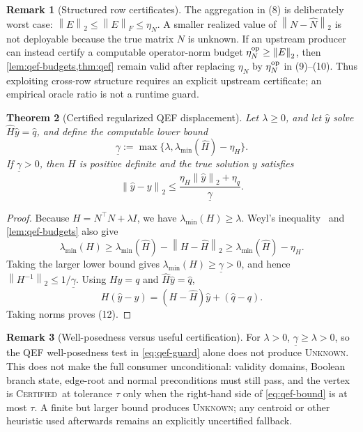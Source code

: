 \documentclass[11pt]{article}
\newtheorem{theorem}{Theorem}
\theoremstyle{definition}
\newtheorem{remark}[theorem]{Remark}
\newcommand{\norm}[1]{\left\lVert#1\right\rVert}
\newcommand{\Certified}{\textsc{Certified}}
\newcommand{\Unknown}{\textsc{Unknown}}
\begin{document}
\begin{remark}[Structured row certificates]
\label{rem:row-structure}
The aggregation in (8) is deliberately worst case:
\(\norm E_2\le\norm E_F\le\eta_N\).  A smaller realized value of
\(\norm{N-\widehat N}_2\) is not deployable because the true matrix \(N\) is
unknown.  If an upstream producer can instead certify a computable
operator-norm budget \(\eta_N^{\rm op}\ge\norm E_2\), then
\cref{lem:qef-budgets,thm:qef} remain valid after replacing \(\eta_N\) by
\(\eta_N^{\rm op}\) in (9)--(10).  Thus exploiting cross-row structure requires
an explicit upstream certificate; an empirical oracle ratio is not a runtime
guard.
\end{remark}

\begin{theorem}[Certified regularized QEF displacement]
\label{thm:qef}
Let \(\lambda\ge0\), and let \(\widehat y\) solve
\(
\widehat H\widehat y=\widehat q
\), and define the computable lower bound
\[
\underline\gamma
:=\max\{\lambda,\lambda_{\min}(\widehat H)-\eta_H\}.
\tag{11}\label{eq:qef-guard}
\]
If \(\underline\gamma>0\), then \(H\) is positive definite and the true
solution \(y\) satisfies
\[
\boxed{
\norm{\widehat y-y}_2
\le
\frac{\eta_H\norm{\widehat y}_2+\eta_q}{\underline\gamma}.}
\tag{12}\label{eq:qef-bound}
\]
\end{theorem}

\begin{proof}
Because \(H=N^\top N+\lambda I\), we have
\(\lambda_{\min}(H)\ge\lambda\).  Weyl's inequality~\cite{bhatia1997matrix}
and
\cref{lem:qef-budgets} also give
\[
\lambda_{\min}(H)
\ge\lambda_{\min}(\widehat H)-\norm{H-\widehat H}_2
\ge\lambda_{\min}(\widehat H)-\eta_H.
\]
Taking the larger lower bound gives
\(\lambda_{\min}(H)\ge\underline\gamma>0\), and hence
\(\norm{H^{-1}}_2\le1/\underline\gamma\).  Using
\(Hy=q\) and \(\widehat H\widehat y=\widehat q\),
\[
H(\widehat y-y)
=(H-\widehat H)\widehat y+(\widehat q-q).
\]
Taking norms proves (12).
\end{proof}

\begin{remark}[Well-posedness versus useful certification]
\label{rem:fail-closed}
For \(\lambda>0\), \(\underline\gamma\ge\lambda>0\), so the QEF
well-posedness test in \eqref{eq:qef-guard} alone does not produce
\Unknown.  This does not make the full consumer unconditional: validity
domains, Boolean branch state, edge-root and normal preconditions must still
pass, and the vertex is \Certified\ at tolerance \(\tau\) only when the
right-hand side of \eqref{eq:qef-bound} is at most \(\tau\).  A finite but
larger bound produces \Unknown; any centroid or other heuristic used
afterwards remains an explicitly uncertified fallback.
\end{remark}
\end{document}
